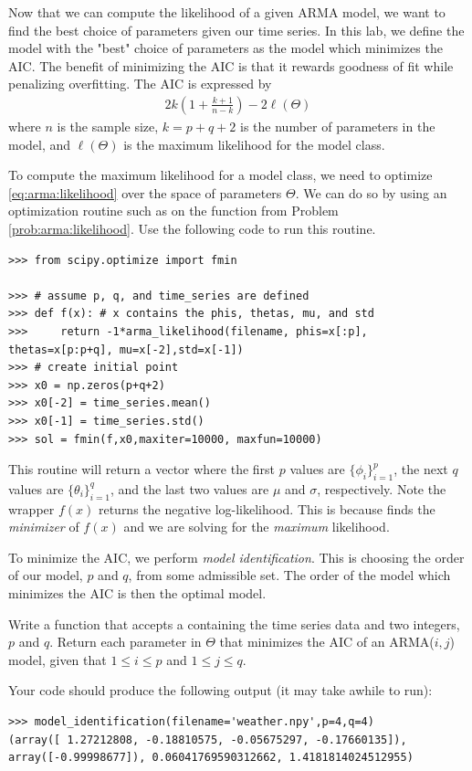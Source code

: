 Now that we can compute the likelihood of a given ARMA model, we want to find the best choice of parameters given our time series.
In this lab, we define the model with the "best" choice of parameters as the model which minimizes the AIC.
The benefit of minimizing the AIC is that it rewards goodness of fit while penalizing overfitting.
The AIC is expressed by
\begin{align}
    2k\left(1 + \frac{k+1}{n-k}\right) - 2 \ell(\Theta)
\end{align}
where $n$ is the sample size, $k = p + q + 2$ is the number of parameters in
the model, and $\ell(\Theta)$ is the maximum likelihood for the model class.

To compute the maximum likelihood for a model class, we need to optimize
\ref{eq:arma:likelihood} over the space of parameters $\Theta$. We can do so
by using an optimization routine such as  on the function  from Problem \ref{prob:arma:likelihood}.
Use the following code to run this routine.

\begin{lstlisting}
>>> from scipy.optimize import fmin

>>> # assume p, q, and time_series are defined
>>> def f(x): # x contains the phis, thetas, mu, and std
>>>     return -1*arma_likelihood(filename, phis=x[:p], thetas=x[p:p+q], mu=x[-2],std=x[-1])
>>> # create initial point
>>> x0 = np.zeros(p+q+2)
>>> x0[-2] = time_series.mean()
>>> x0[-1] = time_series.std()
>>> sol = fmin(f,x0,maxiter=10000, maxfun=10000)
\end{lstlisting}

This routine will return a vector  where the first $p$ values are $\{\phi_i\}_{i=1}^p$, the next $q$ values are $\{\theta_i\}_{i=1}^q$, and the last two values are $\mu$ and $\sigma$, respectively.
Note the wrapper $f(x)$ returns the negative log-likelihood.
This is because  finds the \emph{minimizer} of $f(x)$ and we are solving for the \emph{maximum} likelihood.

To minimize the AIC, we perform \emph{model identification}.
This is choosing the order of our model, $p$ and $q$, from some admissible set.
The order of the model which minimizes the AIC is then the optimal model.

\begin{problem}
\label{prob:model-identification}
Write a function  that accepts a  containing the time series data and two integers, $p$ and $q$. 
Return each parameter in $\Theta$ that minimizes the AIC of an ARMA($i,j$) model, given that $1\leq i \leq p$ and $1\leq j \leq q$.

Your code should produce the following output (it may take awhile to run):
\begin{lstlisting}
>>> model_identification(filename='weather.npy',p=4,q=4)
(array([ 1.27212808, -0.18810575, -0.05675297, -0.17660135]), array([-0.99998677]), 0.06041769590312662, 1.4181814024512955)
\end{lstlisting}
\end{problem}

